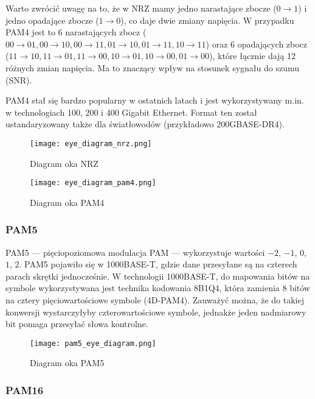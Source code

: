 Warto zwrócić uwagę na to, że w NRZ mamy jedno narastające zbocze ($0 \rightarrow 1$) i jedno opadające zbocze ($1 \rightarrow 0$), co daje dwie zmiany napięcia. W przypadku PAM4 jest to 6 narastających zbocz
($00 \rightarrow 01, 00 \rightarrow 10, 00 \rightarrow 11, 01 \rightarrow 10, 01 \rightarrow 11, 10 \rightarrow 11$) oraz 6 opadających zbocz
($11 \rightarrow 10, 11 \rightarrow 01, 11 \rightarrow 00, 10 \rightarrow 01, 10 \rightarrow 00, 01 \rightarrow 00$), które łącznie dają 12 różnych zmian napięcia.
Ma to znaczący wpływ na stosunek sygnału do szumu (SNR).

PAM4 stał się bardzo popularny w ostatnich latach i jest wykorzystywany m.in. w technologiach 100, 200 i 400 Gigabit Ethernet. Format ten został ustandaryzowany
także dla światłowodów (przykładowo 200GBASE-DR4).

\begin{figure}[ht]
    \centering
    \texttt{[image: eye\_diagram\_nrz.png]}
    \caption{Diagram oka NRZ}
    \label{fig:diagram_oka_nrz}
\end{figure}

\begin{figure}[ht]
    \centering
    \texttt{[image: eye\_diagram\_pam4.png]}
    \caption{Diagram oka PAM4}
    \label{fig:diagram_oka_pam4}
\end{figure}

\subsubsection{PAM5}
PAM5 --- pięciopoziomowa modulacja PAM --- wykorzystuje wartości $-2$, $-1$, $0$, $1$, $2$. PAM5 pojawiło się w 1000BASE-T, gdzie dane przesyłane są na czterech parach
skrętki jednocześnie. W technologii 1000BASE-T, do mapowania bitów na symbole wykorzystywana jest technika kodowania 8B1Q4, która zamienia
8 bitów na cztery pięciowartościowe symbole (4D-PAM4). Zauważyć można, że do takiej konwersji wystarczyłyby czterowartościowe symbole, jednakże
jeden nadmiarowy bit pomaga przesyłać słowa kontrolne.

\begin{figure}[ht]
    \centering
    \texttt{[image: pam5\_eye\_diagram.png]}
    \caption{Diagram oka PAM5}
    \label{fig:diagram_oka_pam5}
\end{figure}

\subsubsection{PAM16}

